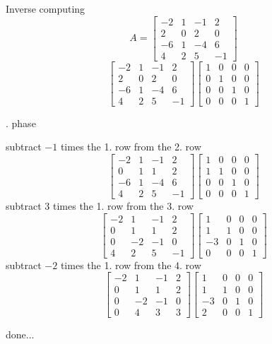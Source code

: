 \documentclass[12pt]{article}
\begin{document}
Inverse computing
$$ A=\left[{\begin{array}{cccc}-2& 1& -1& 2\\ 2& 0& 2& 0\\ -6& 1& -4& 6\\ 4& 2& 5& -1\end{array}}\right]$$
$$\left[{\begin{array}{cccc}-2& 1& -1& 2\\ 2& 0& 2& 0\\ -6& 1& -4& 6\\ 4& 2& 5& -1\end{array}}\right]\left[{\begin{array}{cccc}1& 0& 0& 0\\ 0& 1& 0& 0\\ 0& 0& 1& 0\\ 0& 0& 0& 1\end{array}}\right]$$
\par{}. phase

subtract $-1$ times the 1. row from the 2. row
$$\left[{\begin{array}{cccc}-2& 1& -1& 2\\ 0& 1& 1& 2\\ -6& 1& -4& 6\\ 4& 2& 5& -1\end{array}}\right]\left[{\begin{array}{cccc}1& 0& 0& 0\\ 1& 1& 0& 0\\ 0& 0& 1& 0\\ 0& 0& 0& 1\end{array}}\right]$$
subtract $3$ times the 1. row from the 3. row
$$\left[{\begin{array}{cccc}-2& 1& -1& 2\\ 0& 1& 1& 2\\ 0& -2& -1& 0\\ 4& 2& 5& -1\end{array}}\right]\left[{\begin{array}{cccc}1& 0& 0& 0\\ 1& 1& 0& 0\\ -3& 0& 1& 0\\ 0& 0& 0& 1\end{array}}\right]$$
subtract $-2$ times the 1. row from the 4. row
$$\left[{\begin{array}{cccc}-2& 1& -1& 2\\ 0& 1& 1& 2\\ 0& -2& -1& 0\\ 0& 4& 3& 3\end{array}}\right]\left[{\begin{array}{cccc}1& 0& 0& 0\\ 1& 1& 0& 0\\ -3& 0& 1& 0\\ 2& 0& 0& 1\end{array}}\right]$$
\par\noindent done...
\end{document}
